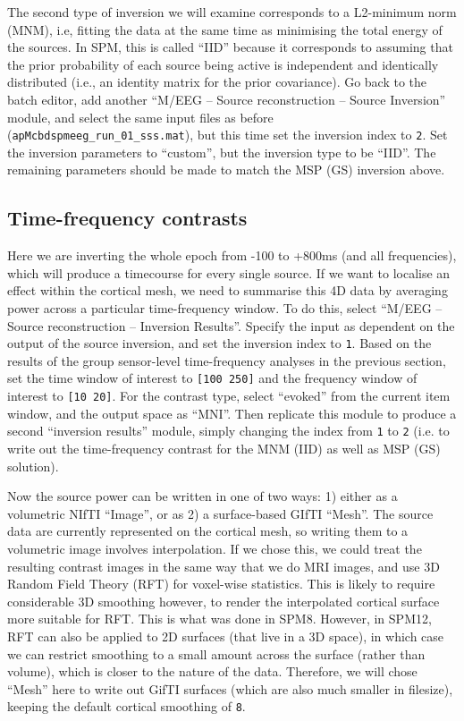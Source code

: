 The second type of inversion we will examine corresponds to a L2-minimum norm (MNM), i.e, fitting the data at the same time as minimising the total energy of the sources. In SPM, this is called ``IID'' because it corresponds to assuming that the prior probability of each source being active is independent and identically distributed (i.e., an identity matrix for the prior covariance). Go back to the batch editor, add another ``M/EEG -- Source reconstruction -- Source Inversion'' module, and select the same input files as before (\texttt{apMcbdspmeeg\_run\_01\_sss.mat}), but this time set the inversion index to \texttt{2}. Set the inversion parameters to ``custom'', but the inversion type to be ``IID''. The remaining parameters should be made to match the MSP (GS) inversion above.

\subsection{Time-frequency contrasts}

Here we are inverting the whole epoch from -100 to +800ms (and all frequencies), which will produce a timecourse for every single source. If we want to localise an effect within the cortical mesh, we need to summarise this 4D data by averaging power across a particular time-frequency window. To do this, select ``M/EEG -- Source reconstruction -- Inversion Results''. Specify the input as dependent on the output of the source inversion, and set the inversion index to \texttt{1}. Based on the results of the group sensor-level time-frequency analyses in the previous section, set the time window of interest to \texttt{[100 250]} and the frequency window of interest to \texttt{[10 20]}. For the contrast type, select ``evoked'' from the current item window, and the output space as ``MNI''. Then replicate this module to produce a second ``inversion results'' module, simply changing the index from \texttt{1} to \texttt{2} (i.e. to write out the time-frequency contrast for the MNM (IID) as well as MSP (GS) solution).

Now the source power can be written in one of two ways: 1) either as a volumetric NIfTI ``Image'', or as 2) a surface-based GIfTI ``Mesh''. The source data are currently represented on the cortical mesh, so writing them to a volumetric image involves interpolation. If we chose this, we could treat the resulting contrast images in the same way that we do MRI images, and use 3D Random Field Theory (RFT) for voxel-wise statistics. This is likely to require considerable 3D smoothing however, to render the interpolated cortical surface more suitable for RFT. This is what was done in SPM8. However, in SPM12, RFT can also be applied to 2D surfaces (that live in a 3D space), in which case we can restrict smoothing to a small amount across the surface (rather than volume), which is closer to the nature of the data. Therefore, we will chose ``Mesh'' here to write out GifTI surfaces (which are also much smaller in filesize), keeping the default cortical smoothing of \texttt{8}.

